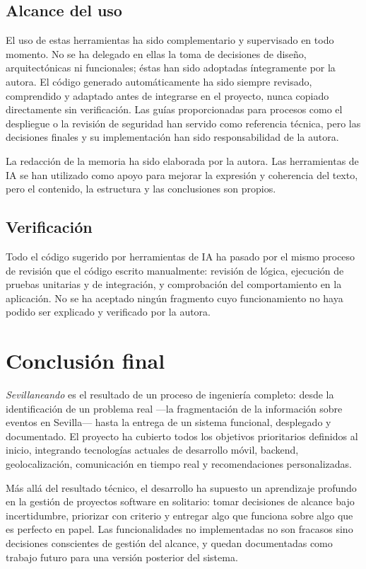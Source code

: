 \subsection{Alcance del uso}

El uso de estas herramientas ha sido complementario y supervisado en todo momento. No se ha delegado en ellas la toma de decisiones de diseño, arquitectónicas ni funcionales; éstas han sido adoptadas íntegramente por la autora. El código generado automáticamente ha sido siempre revisado, comprendido y adaptado antes de integrarse en el proyecto, nunca copiado directamente sin verificación. Las guías proporcionadas para procesos como el despliegue o la revisión de seguridad han servido como referencia técnica, pero las decisiones finales y su implementación han sido responsabilidad de la autora.

La redacción de la memoria ha sido elaborada por la autora. Las herramientas de IA se han utilizado como apoyo para mejorar la expresión y coherencia del texto, pero el contenido, la estructura y las conclusiones son propios.

\subsection{Verificación}

Todo el código sugerido por herramientas de IA ha pasado por el mismo proceso de revisión que el código escrito manualmente: revisión de lógica, ejecución de pruebas unitarias y de integración, y comprobación del comportamiento en la aplicación. No se ha aceptado ningún fragmento cuyo funcionamiento no haya podido ser explicado y verificado por la autora.

\section{Conclusión final}

\textit{Sevillaneando} es el resultado de un proceso de ingeniería completo: desde la identificación de un problema real ---la fragmentación de la información sobre eventos en Sevilla--- hasta la entrega de un sistema funcional, desplegado y documentado. El proyecto ha cubierto todos los objetivos prioritarios definidos al inicio, integrando tecnologías actuales de desarrollo móvil, backend, geolocalización, comunicación en tiempo real y recomendaciones personalizadas.

Más allá del resultado técnico, el desarrollo ha supuesto un aprendizaje profundo en la gestión de proyectos software en solitario: tomar decisiones de alcance bajo incertidumbre, priorizar con criterio y entregar algo que funciona sobre algo que es perfecto en papel. Las funcionalidades no implementadas no son fracasos sino decisiones conscientes de gestión del alcance, y quedan documentadas como trabajo futuro para una versión posterior del sistema.
